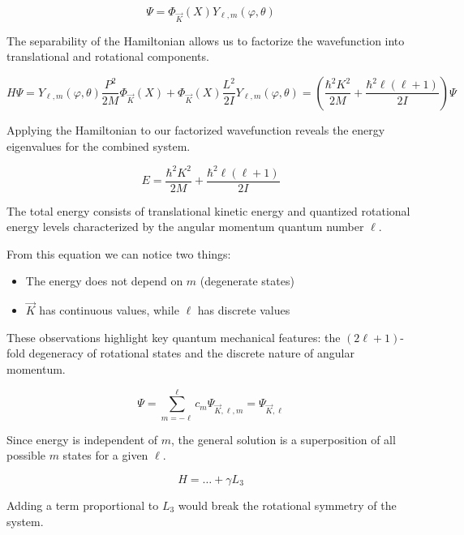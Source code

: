 \documentclass[italian]{HKNdocument}
\begin{document}
\begin{equation}
\Psi=\Phi_{\vec{K}}(X) Y_{\ell, m}(\varphi, \theta)
\end{equation}

The separability of the Hamiltonian allows us to factorize the wavefunction into translational and rotational components.

\begin{equation}
H \Psi=Y_{\ell, m}(\varphi, \theta) \frac{P^{2}}{2 M} \Phi_{\vec{K}}(X)+\Phi_{\vec{K}}(X) \frac{L^{2}}{2 I} Y_{\ell, m}(\varphi, \theta)=\left(\frac{\hbar^{2} K^{2}}{2 M}+\frac{\hbar^{2} \ell(\ell+1)}{2 I}\right) \Psi
\end{equation}

Applying the Hamiltonian to our factorized wavefunction reveals the energy eigenvalues for the combined system.

\begin{equation}
E=\frac{\hbar^{2} K^{2}}{2 M}+\frac{\hbar^{2} \ell(\ell+1)}{2 I}
\end{equation}

The total energy consists of translational kinetic energy and quantized rotational energy levels characterized by the angular momentum quantum number $\ell$.

From this equation we can notice two things:

\begin{itemize}
  \item The energy does not depend on $m$ (degenerate states)
  \item $\vec{K}$ has continuous values, while $\ell$ has discrete values
\end{itemize}

These observations highlight key quantum mechanical features: the $(2\ell+1)$-fold degeneracy of rotational states and the discrete nature of angular momentum.

\begin{equation}
\Psi=\sum_{m=-\ell}^{\ell} c_{m} \Psi_{\vec{K}, \ell, m}=\Psi_{\vec{K}, \ell}
\end{equation}

Since energy is independent of $m$, the general solution is a superposition of all possible $m$ states for a given $\ell$.

\begin{equation}
H=\ldots+\gamma L_{3}
\end{equation}

Adding a term proportional to $L_3$ would break the rotational symmetry of the system.
\end{document}
